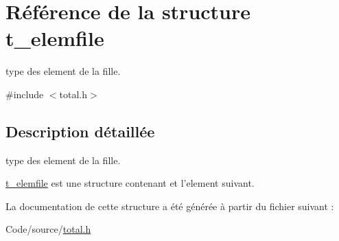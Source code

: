 \hypertarget{structt__elemfile}{\section{Référence de la structure t\-\_\-elemfile}
\label{structt__elemfile}
}


type des element de la fille.  




{\ttfamily \#include $<$total.\-h$>$}



\subsection{Description détaillée}
type des element de la fille. 

\hyperlink{structt__elemfile}{t\-\_\-elemfile} est une structure contenant et l'element suivant. 

La documentation de cette structure a été générée à partir du fichier suivant \-:\begin{DoxyCompactItemize}
\item 
Code/source/\hyperlink{total_8h}{total.\-h}\end{DoxyCompactItemize}

